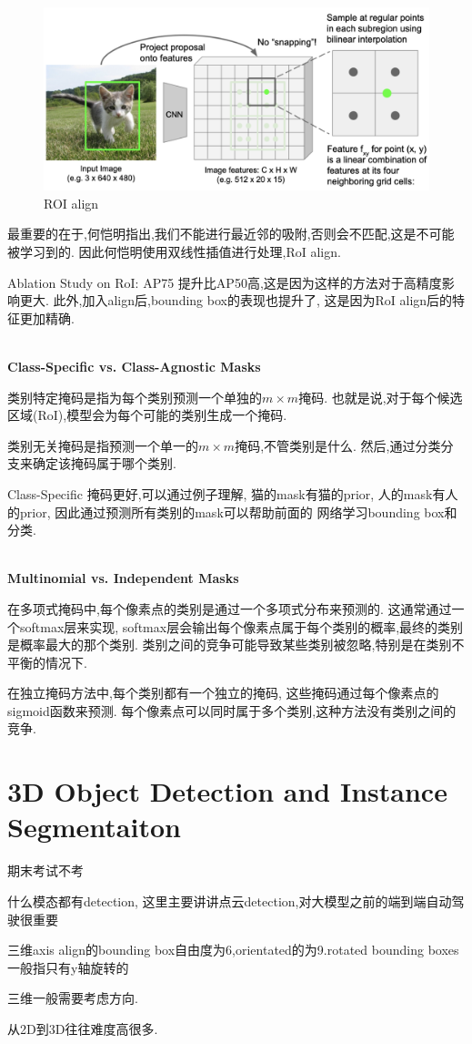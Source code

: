 \begin{figure}[H]
    \centering
    \includegraphics[scale=0.2]{figures/ROI_align.png}
    \caption{ROI align}
    \label{fig:ROI_align}
\end{figure}

最重要的在于,何恺明指出,我们不能进行最近邻的吸附,否则会不匹配,这是不可能被学习到的.
因此何恺明使用双线性插值进行处理,RoI align.

Ablation Study on RoI:
AP75 提升比AP50高,这是因为这样的方法对于高精度影响更大.
此外,加入align后,bounding box的表现也提升了, 这是因为RoI align后的特征更加精确.

\textbf{\\Class-Specific vs. Class-Agnostic Masks}

类别特定掩码是指为每个类别预测一个单独的$m \times m$掩码.
也就是说,对于每个候选区域(RoI),模型会为每个可能的类别生成一个掩码.

类别无关掩码是指预测一个单一的$m \times m$掩码,不管类别是什么.
然后,通过分类分支来确定该掩码属于哪个类别.

Class-Specific 掩码更好,可以通过例子理解,
猫的mask有猫的prior, 人的mask有人的prior, 因此通过预测所有类别的mask可以帮助前面的
网络学习bounding box和分类.

\textbf{\\Multinomial vs. Independent Masks}

在多项式掩码中,每个像素点的类别是通过一个多项式分布来预测的.
这通常通过一个softmax层来实现,
softmax层会输出每个像素点属于每个类别的概率,最终的类别是概率最大的那个类别.
类别之间的竞争可能导致某些类别被忽略,特别是在类别不平衡的情况下.

在独立掩码方法中,每个类别都有一个独立的掩码,
这些掩码通过每个像素点的sigmoid函数来预测.
每个像素点可以同时属于多个类别,这种方法没有类别之间的竞争.

\section{3D Object Detection and Instance Segmentaiton}

期末考试不考

什么模态都有detection, 这里主要讲讲点云detection,对大模型之前的端到端自动驾驶很重要

三维axis align的bounding box自由度为6,orientated的为9.rotated bounding boxes
一般指只有y轴旋转的

三维一般需要考虑方向.

从2D到3D往往难度高很多.
